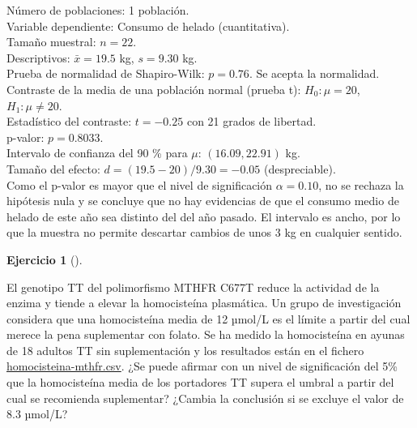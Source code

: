 \documentclass[
  spanish,
  a4paper,
]{scrreport}
\theoremstyle{definition}
\newtheorem{exercise}{Ejercicio}[chapter]
\theoremstyle{remark}
\begin{document}
\begin{tcolorbox}[enhanced jigsaw, arc=.35mm, bottomrule=.15mm, bottomtitle=1mm, breakable, colback=white, colbacktitle=quarto-callout-tip-color!10!white, colframe=quarto-callout-tip-color-frame, coltitle=black, left=2mm, leftrule=.75mm, opacityback=0, opacitybacktitle=0.6, rightrule=.15mm, title=\textcolor{quarto-callout-tip-color}{\faLightbulb}\hspace{0.5em}{Solución}, titlerule=0mm, toprule=.15mm, toptitle=1mm]

Número de poblaciones: 1 población.\\
Variable dependiente: Consumo de helado (cuantitativa).\\
Tamaño muestral: \(n=22\).\\
Descriptivos: \(\bar x=19.5\) kg, \(s=9.30\) kg.\\
Prueba de normalidad de Shapiro-Wilk: \(p=0.76\). Se acepta la
normalidad.\\
Contraste de la media de una población normal (prueba t):
\(H_0:\mu=20\), \(H_1:\mu\neq 20\).\\
Estadístico del contraste: \(t=-0.25\) con 21 grados de libertad.\\
p-valor: \(p=0.8033\).\\
Intervalo de confianza del 90 \% para \(\mu\): \((16.09, 22.91)\) kg.\\
Tamaño del efecto: \(d=(19.5-20)/9.30=-0.05\) (despreciable).\\
Como el p-valor es mayor que el nivel de significación \(\alpha=0.10\),
no se rechaza la hipótesis nula y se concluye que no hay evidencias de
que el consumo medio de helado de este año sea distinto del del año
pasado. El intervalo es ancho, por lo que la muestra no permite
descartar cambios de unos 3 kg en cualquier sentido.

\end{tcolorbox}

\begin{exercise}[]\protect\hypertarget{exr-contraste-ia-media-homocisteina-mthfr}{}\label{exr-contraste-ia-media-homocisteina-mthfr}

El genotipo TT del polimorfismo MTHFR C677T reduce la actividad de la
enzima y tiende a elevar la homocisteína plasmática. Un grupo de
investigación considera que una homocisteína media de 12 µmol/L es el
límite a partir del cual merece la pena suplementar con folato. Se ha
medido la homocisteína en ayunas de 18 adultos TT sin suplementación y
los resultados están en el fichero
\href{datos/homocisteina-mthfr.csv}{homocisteina-mthfr.csv}. ¿Se puede
afirmar con un nivel de significación del 5\% que la homocisteína media
de los portadores TT supera el umbral a partir del cual se recomienda
suplementar? ¿Cambia la conclusión si se excluye el valor de 8.3 µmol/L?

\end{exercise}
\end{document}
